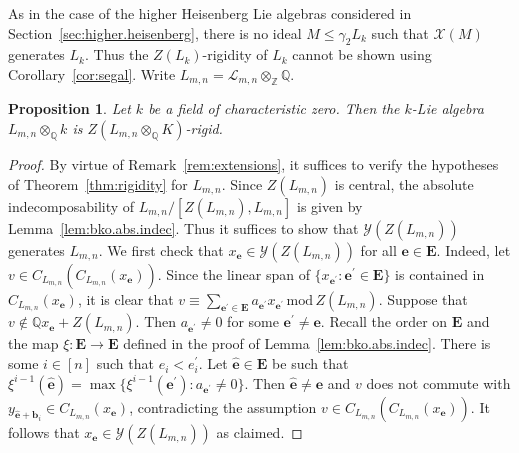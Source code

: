 \documentclass[11pt,a4paper]{amsart}
\theoremstyle{plain}
\newtheorem{pro}[thm]{Proposition}
\theoremstyle{remark}
\newcommand{\Z}{\mathbb{Z}}
\newcommand{\Q}{\mathbb{Q}}
\newcommand{\tensor}{\otimes}
\begin{document}
As in the case of the higher Heisenberg Lie algebras considered in Section~\ref{sec:higher.heisenberg}, there is no ideal $M \leq \gamma_2 L_k$ such that $\mathcal{X}(M)$ generates $L_k$.  Thus the $Z(L_k)$-rigidity of $L_k$ cannot be shown using Corollary~\ref{cor:segal}.  Write $L_{m,n} = \mathcal{L}_{m,n} \tensor_\Z \Q$.

\begin{pro} \label{pro:lmn.rigid}
Let $k$ be a field of characteristic zero.  Then the $k$-Lie algebra $L_{m,n} \tensor_\Q k$ is $Z(L_{m,n} \tensor_\Q K)$-rigid.
\end{pro}
\begin{proof}
By virtue of Remark~\ref{rem:extensions}, it suffices to verify the hypotheses of Theorem~\ref{thm:rigidity} for $L_{m,n}$.  Since $Z(L_{m,n})$ is central, the absolute indecomposability of $L_{m,n} / [Z(L_{m,n}), L_{m,n}]$ is given by Lemma~\ref{lem:bko.abs.indec}.  Thus it suffices to show that $\mathcal{Y}(Z(L_{m,n}))$ generates $L_{m,n}$.  We first check that $x_{\mathbf{e}} \in \mathcal{Y}(Z(L_{m,n}))$ for all $\mathbf{e} \in \mathbf{E}$.  Indeed, let $v \in C_{L_{m,n}}(C_{L_{m,n}}(x_\mathbf{e}))$.  Since the linear span of $\{ x_{\mathbf{e}^\prime} : \mathbf{e}^\prime \in \mathbf{E} \}$ is contained in $C_{L_{m,n}}(x_\mathbf{e})$, it is clear that
$ v \equiv \sum_{\mathbf{e}^\prime \in \mathbf{E}} a_{\mathbf{e}^\prime} x_{\mathbf{e}^\prime} \, \mathrm{mod} \, Z(L_{m,n})$.  Suppose that $v \not\in \Q x_{\mathbf{e}} + Z(L_{m,n})$.  Then $a_{\mathbf{e}^\prime} \neq 0$ for some $\mathbf{e}^\prime \neq \mathbf{e}$.  Recall the order on $\mathbf{E}$ and the map $\xi : \mathbf{E} \to \mathbf{E}$ defined in the proof of Lemma~\ref{lem:bko.abs.indec}.  There is some $i \in [n]$ such that $e_i < e_i^\prime$.  Let $\widehat{\mathbf{e}} \in \mathbf{E}$ be such that $\xi^{i-1}(\widehat{\mathbf{e}}) = \max \{ \xi^{i-1}(\mathbf{e}^\prime) : a_{\mathbf{e}^\prime} \neq 0 \}$.  Then $\widehat{\mathbf{e}} \neq \mathbf{e}$ and $v$ does not commute with $y_{\widehat{\mathbf{e}} + \mathbf{b}_i} \in C_{L_{m,n}}(x_{\mathbf{e}})$, contradicting the assumption $v \in C_{L_{m,n}}(C_{L_{m,n}}(x_\mathbf{e}))$.  It follows that $x_{\mathbf{e}} \in \mathcal{Y}(Z(L_{m,n}))$ as claimed.


\end{proof}
\end{document}
